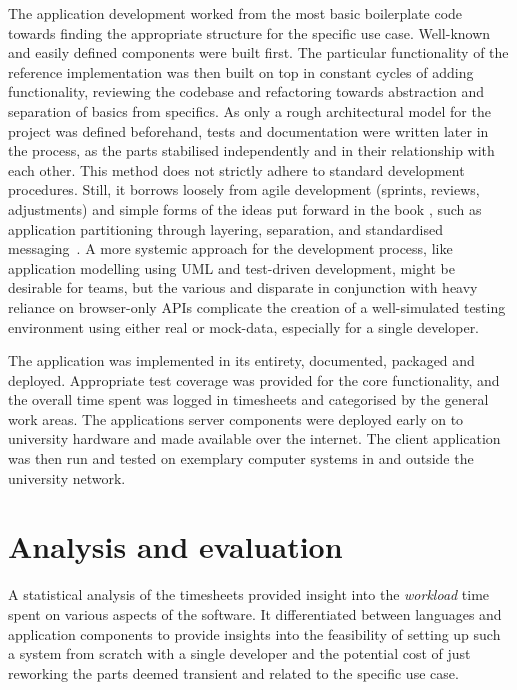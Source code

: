 The application development worked from the most basic boilerplate code towards finding the appropriate structure for the specific use case.
Well-known and easily defined components were built first.
The particular functionality of the reference implementation was then built on top in constant cycles of adding functionality, reviewing the codebase and refactoring towards abstraction and separation of basics from specifics.
As only a rough architectural model for the project was defined beforehand, tests and documentation were written later in the process, as the parts stabilised independently and in their relationship with each other.
This method does not strictly adhere to standard development procedures.
Still, it borrows loosely from agile development (sprints, reviews, adjustments) and simple forms of the ideas put forward in the book , such as application partitioning through layering, separation, and standardised messaging~\parencite{patternOrientedSoftwareArchitecture}.
A more systemic approach for the development process, like application modelling using \ac{UML} and test-driven development, might be desirable for teams, but the various and disparate  in conjunction with heavy reliance on browser-only \ac{API}s complicate the creation of a well-simulated testing environment using either real or mock-data, especially for a single developer.

The application was implemented in its entirety, documented, packaged and deployed.
Appropriate test coverage was provided for the core functionality, and the overall time spent was logged in timesheets and categorised by the general work areas.
The application\textquotesingle s server components were deployed early on to university hardware and made available over the internet.
The client application was then run and tested on exemplary computer systems in and outside the university network.

\section{Analysis and evaluation}
\label{sec:analysis-evaluation}

A statistical analysis of the timesheets provided insight into the \emph{workload} time spent on various aspects of the software.
It differentiated between languages and application components to provide insights into the feasibility of setting up such a system from scratch with a single developer and the potential cost of just reworking the parts deemed transient and related to the specific use case.

